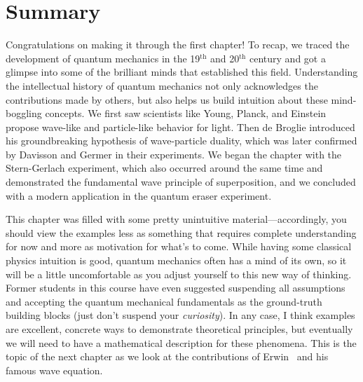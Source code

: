 \section{Summary}

Congratulations on making it through the first chapter! 
To recap, we traced the development of quantum mechanics in the 19$^{\text{th}}$ and 20$^{\text{th}}$ century and got a glimpse into some of the brilliant minds that established this field. 
Understanding the intellectual history of quantum mechanics not only acknowledges the contributions made by others, but also helps us build intuition about these mind-boggling concepts. 
We first saw scientists like Young, Planck, and Einstein propose wave-like and particle-like behavior for light. 
Then de Broglie introduced his groundbreaking hypothesis of wave-particle duality, which was later confirmed by Davisson and Germer in their experiments. 
We began the chapter with the Stern-Gerlach experiment, which also occurred around the same time and demonstrated the fundamental wave principle of superposition, and we concluded with a modern application in the quantum eraser experiment. 

This chapter was filled with some pretty unintuitive material---accordingly, you should view the examples less as something that requires complete understanding for now and more as motivation for what's to come. 
While having some classical physics intuition is good, quantum mechanics often has a mind of its own, so it will be a little uncomfortable as you adjust yourself to this new way of thinking. 
Former students in this course have even suggested suspending all assumptions and accepting the quantum mechanical fundamentals as the ground-truth building blocks (just don't suspend your \emph{curiosity}).
In any case, I think examples are excellent, concrete ways to demonstrate theoretical principles, but eventually we will need to have a mathematical description for these phenomena. 
This is the topic of the next chapter as we look at the contributions of Erwin \Sch\ and his famous wave equation.

%
